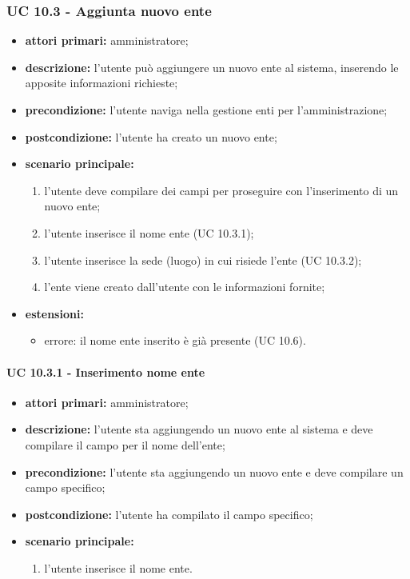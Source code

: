 			\subsubsection{UC 10.3 - Aggiunta nuovo ente}
			\begin{itemize}
				\item \textbf{attori primari:} amministratore;
				\item \textbf{descrizione:} l'utente può aggiungere un nuovo ente al sistema, inserendo le apposite informazioni richieste;
				\item \textbf{precondizione:} l'utente naviga nella gestione enti per l'amministrazione;
				\item \textbf{postcondizione:} l'utente ha creato un nuovo ente;
				\item \textbf{scenario principale:}
				\begin{enumerate}
					\item{l'utente deve compilare dei campi per proseguire con l'inserimento di un nuovo ente;}
					\item l'utente inserisce il nome ente (UC 10.3.1);
					\item l'utente inserisce la sede (luogo) in cui risiede l'ente (UC 10.3.2);
					\item{l'ente viene creato dall'utente con le informazioni fornite;}
				\end{enumerate}
				\item \textbf{estensioni:}
					\begin{itemize}
						\item errore: il nome ente inserito è già presente (UC 10.6).
					\end{itemize}
			\end{itemize}

				\paragraph{UC 10.3.1 - Inserimento nome ente}
				\begin{itemize}
					\item \textbf{attori primari:} amministratore;
					\item \textbf{descrizione:} l'utente sta aggiungendo un nuovo ente al sistema e deve compilare il campo per il nome dell'ente;
					\item \textbf{precondizione:} l'utente sta aggiungendo un nuovo ente e deve compilare un campo specifico;
					\item \textbf{postcondizione:} l'utente ha compilato il campo specifico;
					\item \textbf{scenario principale:}
					\begin{enumerate}
						\item l'utente inserisce il nome ente.
					\end{enumerate}
				\end{itemize}

